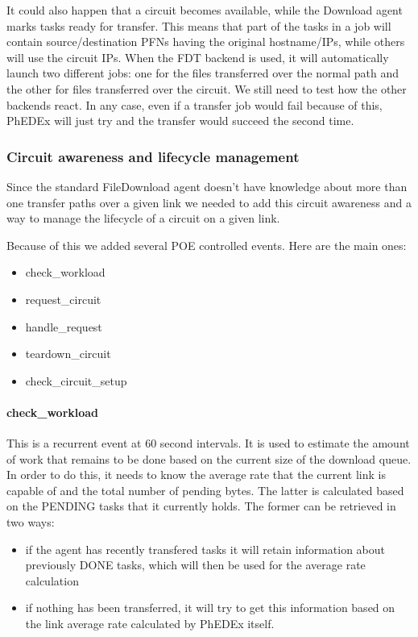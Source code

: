 It could also happen that a circuit becomes available, while the Download agent
marks tasks ready for transfer. This means that part of the tasks in a job
will contain source/destination PFNs having the original hostname/IPs, while
others will use the circuit IPs. When the FDT backend is used, it will automatically
launch two different jobs: one for the files transferred over the normal path
and the other for files transferred over the circuit. We still need to test
how the other backends react. In any case, even if a transfer job would fail 
because of this, PhEDEx will just try and the transfer would succeed the second
time.

\subsubsection{Circuit awareness and lifecycle management}

Since the standard FileDownload agent doesn't have knowledge about more than one
transfer paths over a given link we needed to add this circuit awareness and a
way to manage the lifecycle of a circuit on a given link.

Because of this we added several POE controlled events. Here are the main ones:

\begin{itemize}
  \item check\_workload
  \item request\_circuit
  \item handle\_request
  \item teardown\_circuit
  \item check\_circuit\_setup
\end{itemize}

\paragraph{check\_workload}

This is a recurrent event at 60 second intervals. It is used to estimate the 
amount of work that remains to be done based on the current size of the download
 queue. In order to do this, it needs to know the average rate that the current 
link is capable of and the total number of pending bytes. The latter is calculated
based on the PENDING tasks that it currently holds. The former can be retrieved
in two ways: 

\begin{itemize}
  \item if the agent has recently transfered tasks it will retain information about
previously DONE tasks, which will then be used for the average rate calculation
  \item if nothing has been transferred, it will try to get this information based
on the link average rate calculated by PhEDEx itself.
\end{itemize}

